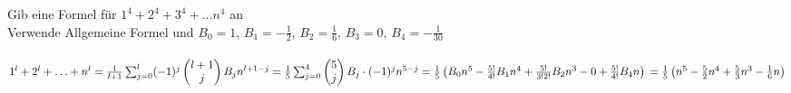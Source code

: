 \begin{example}
	Gib eine Formel für $1^4 + 2^4 + 3^4 + \ldots n^4$ an\\
	Verwende Allgemeine Formel und $B_0 = 1$, $B_1 = - \frac{1}{2}$, $B_2 = \frac{1}{6}$, $B_3 = 0$, $B_4 = -\frac{1}{30}$\\ \\
    $1^l + 2^l + \ldots + n^l = \frac{1}{l+1} \sum^{l}_{j=0} (-1)^j \begin{pmatrix}l+1\\j\end{pmatrix} B_j n^{l+1-j}\\
					 = \frac{1}{5} \sum^{4}_{j=0} \begin{pmatrix}5\\j\end{pmatrix} B_j \cdot (-1)^j n^{5-j}\\
					 = \frac{1}{5} \left( B_0 n^5 - \frac{5!}{4!} B_1 n^4 + \frac{5!}{3!2!} B_2 n^3 -0 + \frac{5!}{4!} B_4 n \right)\\
					 = \frac{1}{5} \left( n^5 - \frac{5}{2} n^4 + \frac{5}{3} n^3 - \frac{1}{6} n \right)$
\end{example}
